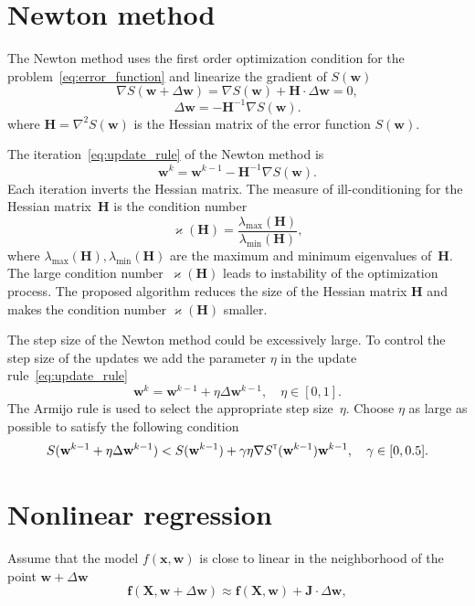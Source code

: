 \documentclass[a4paper,12pt]{article}
\renewcommand{\kappa}{\ensuremath{\varkappa}}
\theoremstyle{plain} %
\theoremstyle{definition} %
\theoremstyle{remark} %
\newcommand{\bw}{\mathbf{w}}
\newcommand{\bx}{\mathbf{x}}
\newcommand{\bJ}{\mathbf{J}}
\newcommand{\bH}{\mathbf{H}}
\newcommand{\bX}{\mathbf{X}}
\newcommand{\T}{{\text{\tiny\sffamily\upshape\mdseries T}}}
\begin{document}
	\section*{Newton method}
	
	The Newton method uses the first order optimization condition for the problem~\eqref{eq:error_function} and linearize the gradient of $S(\bw)$
	\[
		\nabla S (\bw + \Delta \bw) = \nabla S(\bw) + \bH \cdot \Delta \bw = 0,
	\]
	\[
		\Delta \bw = - \bH^{-1} \nabla S(\bw).
	\]
	where $\bH = \nabla^2 S(\bw)$ is the Hessian matrix of the error function $S(\bw)$.
	
	The iteration~\eqref{eq:update_rule} of the Newton method is
	\[
		\bw^k = \bw^{k-1} - \bH^{-1} \nabla S(\bw).
	\]
	Each iteration inverts the Hessian matrix.
	The measure of ill-conditioning for the Hessian matrix~$\bH$ is the condition number
	\[
		\kappa(\bH) = \frac{\lambda_{\text{max}}(\bH)}{\lambda_{\text{min}}(\bH)},
	\]
	where $\lambda_{\text{max}}(\bH), \lambda_{\text{min}}(\bH)$ are the maximum and minimum eigenvalues of~$\bH$. The large condition number~$\kappa(\bH)$ leads to instability of the optimization process.
	The proposed algorithm reduces the size of the Hessian matrix $\bH$ and makes the condition number $\kappa(\bH)$ smaller.
	
	The step size of the Newton method could be excessively large. To control the step size of the updates we add the parameter $\eta$ in the update rule~\eqref{eq:update_rule}
	\[
	\bw^k = \bw^{k - 1} + \eta \Delta \bw^{k - 1}, \quad \eta \in [0, 1].
	\]
	The Armijo rule is used to select the appropriate step size~$\eta$. Choose $\eta$ as large as possible to satisfy the following condition
	\[
	S(\bw^{k - 1} + \eta \Delta \bw^{k - 1}) < S(\bw^{k - 1}) + \gamma \eta \nabla S^{\T}(\bw^{k-1})\bw^{k - 1}, \quad \gamma \in [0, 0.5].
	\]
	
	\section*{Nonlinear regression}
	Assume that the model $f(\bx , \bw)$ is close to linear in the neighborhood of the point $\bw + \Delta \bw$
	\[
	\mathbf{f}(\bX , \bw + \Delta \bw) \approx \mathbf{f}(\bX , \bw) + \bJ \cdot \Delta  \bw,
	\]
	
\end{document}
